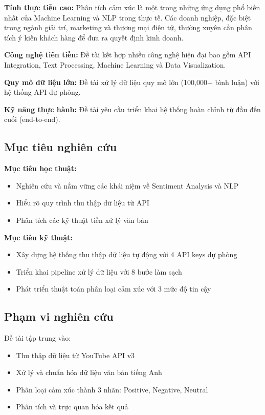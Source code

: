 \textbf{Tính thực tiễn cao:} Phân tích cảm xúc là một trong những ứng dụng phổ biến nhất của Machine Learning và NLP trong thực tế. Các doanh nghiệp, đặc biệt trong ngành giải trí, marketing và thương mại điện tử, thường xuyên cần phân tích ý kiến khách hàng để đưa ra quyết định kinh doanh.

\textbf{Công nghệ tiên tiến:} Đề tài kết hợp nhiều công nghệ hiện đại bao gồm API Integration, Text Processing, Machine Learning và Data Visualization.

\textbf{Quy mô dữ liệu lớn:} Đề tài xử lý dữ liệu quy mô lớn (100,000+ bình luận) với hệ thống API dự phòng.

\textbf{Kỹ năng thực hành:} Đề tài yêu cầu triển khai hệ thống hoàn chỉnh từ đầu đến cuối (end-to-end).

\subsection{Mục tiêu nghiên cứu}
\textbf{Mục tiêu học thuật:}
\begin{itemize}
    \item Nghiên cứu và nắm vững các khái niệm về Sentiment Analysis và NLP
    \item Hiểu rõ quy trình thu thập dữ liệu từ API
    \item Phân tích các kỹ thuật tiền xử lý văn bản
\end{itemize}

\textbf{Mục tiêu kỹ thuật:}
\begin{itemize}
    \item Xây dựng hệ thống thu thập dữ liệu tự động với 4 API keys dự phòng
    \item Triển khai pipeline xử lý dữ liệu với 8 bước làm sạch
    \item Phát triển thuật toán phân loại cảm xúc với 3 mức độ tin cậy
\end{itemize}

\subsection{Phạm vi nghiên cứu}
Đề tài tập trung vào:
\begin{itemize}
    \item Thu thập dữ liệu từ YouTube API v3
    \item Xử lý và chuẩn hóa dữ liệu văn bản tiếng Anh
    \item Phân loại cảm xúc thành 3 nhãn: Positive, Negative, Neutral
    \item Phân tích và trực quan hóa kết quả
\end{itemize}

